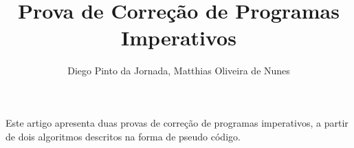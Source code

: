 \documentclass[12pt]{article}
\title{Prova de Correção de Programas Imperativos}
\author{Diego Pinto da Jornada, Matthias Oliveira de Nunes}
\begin{document}
 

\maketitle

\begin{resumo}
    
    Este artigo apresenta duas provas de correção de programas imperativos, a
    partir de dois algoritmos descritos na forma de pseudo código.
    

\end{resumo}






\end{document}
